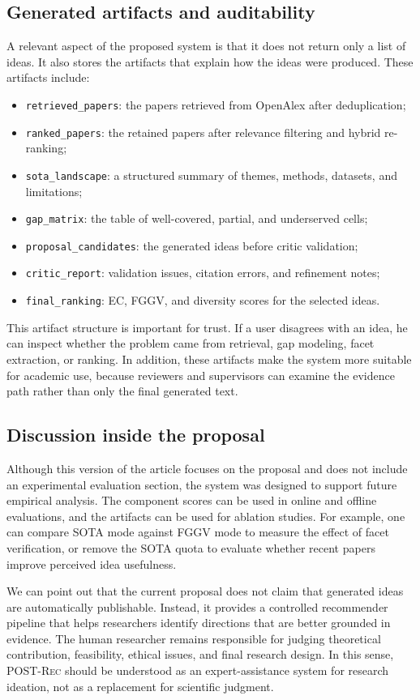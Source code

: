 \documentclass[preprint,12pt]{elsarticle}
\begin{document}
\subsection{Generated artifacts and auditability}

A relevant aspect of the proposed system is that it does not return only a list of ideas. It also stores the artifacts that explain how the ideas were produced. These artifacts include:
\begin{itemize}
  \item \texttt{retrieved\_papers}: the papers retrieved from OpenAlex after deduplication;
  \item \texttt{ranked\_papers}: the retained papers after relevance filtering and hybrid re-ranking;
  \item \texttt{sota\_landscape}: a structured summary of themes, methods, datasets, and limitations;
  \item \texttt{gap\_matrix}: the table of well-covered, partial, and underserved cells;
  \item \texttt{proposal\_candidates}: the generated ideas before critic validation;
  \item \texttt{critic\_report}: validation issues, citation errors, and refinement notes;
  \item \texttt{final\_ranking}: EC, FGGV, and diversity scores for the selected ideas.
\end{itemize}

This artifact structure is important for trust. If a user disagrees with an idea, he can inspect whether the problem came from retrieval, gap modeling, facet extraction, or ranking. In addition, these artifacts make the system more suitable for academic use, because reviewers and supervisors can examine the evidence path rather than only the final generated text.

\subsection{Discussion inside the proposal}

Although this version of the article focuses on the proposal and does not include an experimental evaluation section, the system was designed to support future empirical analysis. The component scores can be used in online and offline evaluations, and the artifacts can be used for ablation studies. For example, one can compare SOTA mode against FGGV mode to measure the effect of facet verification, or remove the SOTA quota to evaluate whether recent papers improve perceived idea usefulness.

We can point out that the current proposal does not claim that generated ideas are automatically publishable. Instead, it provides a controlled recommender pipeline that helps researchers identify directions that are better grounded in evidence. The human researcher remains responsible for judging theoretical contribution, feasibility, ethical issues, and final research design. In this sense, \textsc{POST-Rec} should be understood as an expert-assistance system for research ideation, not as a replacement for scientific judgment.



\end{document}
